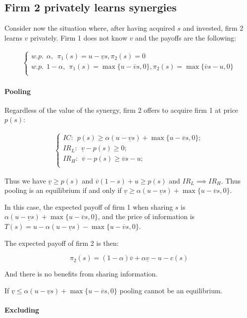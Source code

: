 \documentclass[a4paper,leqno]{article}%
\renewcommand{\a}{\alpha}
\newcommand{\uv}{\underline{v}}
\newcommand{\ov}{\overline{v}}
\begin{document}
\subsection{Firm 2 privately learns synergies}

Consider now the situation where, after having acquired $s$ and invested, firm 2 learns $v$ privately. Firm 1 does not know $v$ and the payoffs are the following:


\begin{align}\label{compbilmixed}
\begin{cases}
    w.p.~~ \a,~~ \pi_1(s)=u-\uv s, \pi_2(s)=0\\ 
    w.p.~~ 1-\a,~~ \pi_1(s)=\max\{u-\ov s,0\}, \pi_2(s)=\max\{\ov s-u,0\}\\ 
\end{cases}
\end{align}

\paragraph{Pooling}

Regardless of the value of the synergy, firm 2 offers to acquire firm 1 at price $p(s)$:

\begin{align}
\begin{cases}
    IC:~~ p(s)\geq \a(u-\uv s)+\max\{u-\ov s,0\};\\ 
    IR_L:~~ \uv -p(s)\geq 0;\\
    IR_H:~~ \ov -p(s)\geq \ov s-u;\\ 
\end{cases}
\end{align}


Thus we have $\uv \geq p(s)$ and $\ov(1-s)+u\geq p(s)$ and $IR_L\implies IR_H$. Thus pooling is an equilibrium if and only if $\uv\geq \a(u-\uv s)+\max\{u-\ov s,0\}$. 

In this case, the expected payoff of firm 1 when sharing $s$ is $\a(u-\uv s)+\max\{u-\ov s,0\}$, and the price of information is $T(s)=u-\a(u-\uv s)-\max\{u-\ov s,0\}$. 

The expected payoff of firm 2 is then:

\[
\pi_2(s)=(1-\a) \ov +\a\uv -u-c(s)
\]


And there is no benefits from sharing information. 

If $\uv\leq \a(u-\uv s)+\max\{u-\ov s,0\}$ pooling cannot be an equilibrium. 


\paragraph{Excluding}
\end{document}
